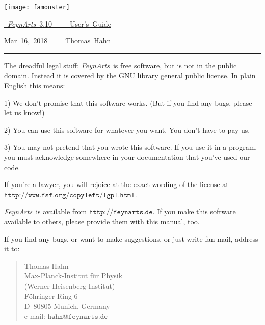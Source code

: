 \documentclass[twoside,12pt]{article}
\def\FA{\textit{FeynArts}}
\def\Code#1{\ensuremath{\texttt{#1}}}
\begin{document}
\thispagestyle{empty}

\vspace*{.2\textheight}

\hfill\texttt{[image: famonster]}

\bigskip\bigskip

\hfill\hbox{\underline{%
\vrule width 0pt height 0pt depth 2ex%
\Huge \FA\ 3.10~~~~~User's Guide}}

\vspace*{1ex}

\hfill\hbox{Mar 16, 2018~~~~~Thomas Hahn}

\clearpage

\vspace*{.5\textheight}
\vfill

\hrule

\medskip

\begin{scriptsize}
The dreadful legal stuff:
\FA\ is free software, but is not in the public domain.
Instead it is covered by the GNU library general public license.
In plain English this means:

1) We don't promise that this software works.   
(But if you find any bugs, please let us know!)

2) You can use this software for whatever you want.
You don't have to pay us.

3) You may not pretend that you wrote this software.
If you use it in a program, you must acknowledge
somewhere in your documentation that you've used  
our code.

If you're a lawyer, you will rejoice at the exact wording of the license 
at \Code{http://www.fsf.org/copyleft/lgpl.html}.

\FA\ is available from \Code{http://feynarts.de}.  If you make this
software available to others, please provide them with this manual, too.

If you find any bugs, or want to make suggestions, or just write fan mail,
address it to:
\vspace*{-2ex}
\begin{quote}
Thomas Hahn \\
Max-Planck-Institut f\"ur Physik \\
(Werner-Heisenberg-Institut) \\
F\"ohringer Ring 6 \\
D--80805 Munich, Germany \\
e-mail: \Code{hahn@feynarts.de}
\end{quote}
\end{scriptsize}
\end{document}
